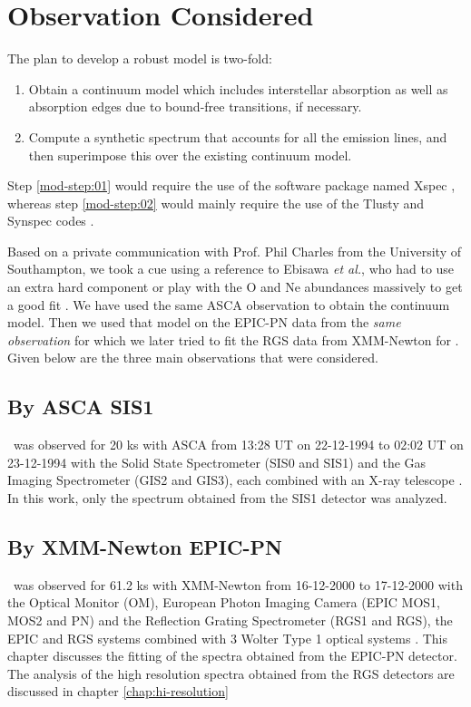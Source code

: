 		\section{Observation Considered} \label{continuum:obs}
			The plan to develop a robust model is two-fold:
			\begin{enumerate}
				\item Obtain a continuum model which includes interstellar absorption as well as absorption edges due to bound-free transitions, if necessary. \label{mod-step:01}
				\item Compute a synthetic spectrum that accounts for all the emission lines, and then superimpose this over the existing continuum model. \label{mod-step:02}
			\end{enumerate}
			
			Step \ref{mod-step:01} would require the use of the software package named Xspec \cite{xspecManualv12_9_1}, whereas step \ref{mod-step:02} would mainly require the use of the Tlusty and Synspec codes \cite{tlustymanualI}.

			Based on a private communication with Prof. Phil Charles from the University of Southampton, we took a cue using a reference to Ebisawa \emph{et al.}, who had to use an extra hard component or play with the O and Ne abundances massively to get a good fit \cite{ebisawa1996}. We have used the same ASCA observation to obtain the continuum model. Then we used that model on the EPIC-PN data from the \emph{same observation} for which we later tried to fit the RGS data from XMM-Newton for \mrvel. Given below are the three main observations that were considered.
			
			\subsection{By ASCA SIS1} \label{continuum:obs:asca}
				\mrvel~was observed for 20 ks with ASCA from 13:28 UT on 22-12-1994 to 02:02 UT on 23-12-1994 with the Solid State Spectrometer (SIS0 and SIS1) and the Gas Imaging Spectrometer (GIS2 and GIS3), each combined with an X-ray telescope \cite{ebisawa1996}. In this work, only the spectrum obtained from the SIS1 detector was analyzed.
				
			\subsection{By XMM-Newton EPIC-PN} \label{continuum:obs:xmm}
				\mrvel~was observed for 61.2 ks with XMM-Newton from 16-12-2000 to 17-12-2000 with the Optical Monitor (OM), European Photon Imaging Camera (EPIC MOS1, MOS2 and PN) and the Reflection Grating Spectrometer (RGS1 and RGS), the EPIC and RGS systems combined with 3 Wolter Type 1 optical systems \cite{motch2002}. This chapter discusses the fitting of the spectra obtained from the EPIC-PN detector. The analysis of the high resolution spectra obtained from the RGS detectors are discussed in chapter \ref{chap:hi-resolution}
		
